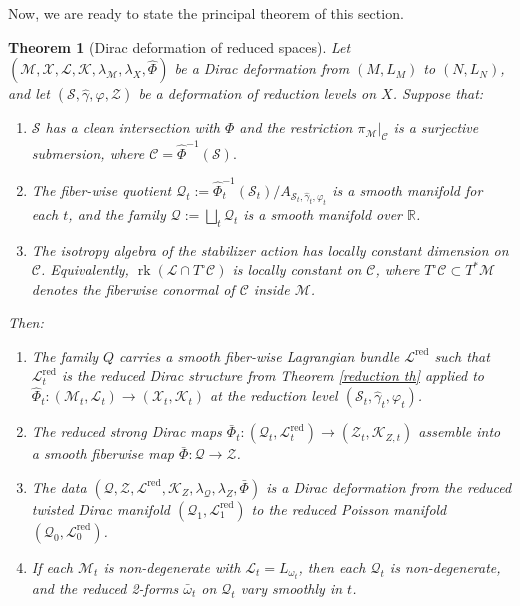\documentclass[reqno]{amsart}
\theoremstyle{plain}
\newtheorem{Thm}{Theorem}[section]
\theoremstyle{definition}
\newcommand{\R}{\mathbb{R}}
\newcommand{\C}{\mathcal{C}}
\renewcommand{\S}{\mathcal{S}}
\newcommand{\M}{\mathcal{M}}
\renewcommand{\L}{\mathcal{L}}
\newcommand{\Z}{\mathcal{Z}}
\newcommand{\X}{\mathcal{X}}
\newcommand{\Q}{\mathcal{Q}}
\newcommand{\K}{\mathcal{K}}
\begin{document}
Now, we are ready to state the principal theorem of this section.
\begin{Thm}[Dirac deformation of reduced spaces]\label{thm:main}
Let $(\M, \X, \L, \K, \lambda_\M, 
\lambda_X, \widehat\Phi)$ be a Dirac deformation from $(M, L_M)$ to 
$(N, L_N)$, and let $(\S, \widehat{\gamma}, \varphi, \Z)$ be a deformation of reduction levels on $X$. Suppose that:
\begin{enumerate}
    \item[(H1)] $\S$ has a clean intersection with $\Phi$ and the restriction $\pi_{\M}|_{\C}$ is a surjective submersion, where $\C = \widehat{\Phi}^{-1}(\S).$
    \item[(H2)] The fiber-wise quotient 
    $\mathcal{Q}_t := \hat\Phi_t^{-1}(\S_t)/A_{\S_t,\widehat{\gamma}_t,\varphi_t}$ 
    is a smooth manifold for each $t$, and the family 
    $\Q := \bigsqcup_{t} \mathcal{Q}_t$ is a smooth manifold 
    over $\R$.
    \item[(H3)] The isotropy algebra of the stabilizer action has locally constant dimension on $\mathcal{C}$. Equivalently,
    $\operatorname{rk}(\mathcal{L} \cap T^{\circ}\mathcal{C})$ is locally constant on $\mathcal{C}$, where $T^{\circ}\mathcal{C} \subset T^{*}\mathcal{M}$ denotes the fiberwise conormal of $\mathcal{C}$ inside $\mathcal{M}$.
\end{enumerate}
Then:
\begin{enumerate}
    \item The family $Q$ carries a smooth fiber-wise Lagrangian bundle
    $\mathcal{L}^{\mathrm{red}}$ such that $\mathcal{L}^{\mathrm{red}}_t$ is the 
    reduced Dirac structure from Theorem \ref{reduction th} applied to 
    $\hat\Phi_t : (\M_t, \L_t) \to (\X_t, \K_t)$ 
    at the reduction level $(\S_t, \widehat{\gamma}_t, \varphi_t)$.
    \item The reduced strong Dirac maps 
    $\bar\Phi_t : (\Q_t, \L^{\mathrm{red}}_t) \to 
    (\Z_t, \K_{Z,t})$ assemble into a smooth fiberwise map 
    $\bar\Phi : \Q \to \Z$.
    \item The data $(\Q, \Z, \L^{\mathrm{red}}, 
    \K_Z, \lambda_\Q, \lambda_Z, \bar\Phi)$ is a Dirac deformation 
    from the reduced twisted Dirac manifold 
    $(\Q_1, \L^{\mathrm{red}}_1)$ to the reduced Poisson manifold 
    $(\Q_0, \L^{\mathrm{red}}_0)$.
    \item If each $\M_t$ is non-degenerate with $\L_t = L_{\omega_t}$, 
    then each $\Q_t$ is non-degenerate, and the reduced 2-forms 
    $\bar\omega_t$ on $\mathcal{Q}_t$ vary smoothly in $t$.
\end{enumerate}
\end{Thm}
\end{document}
